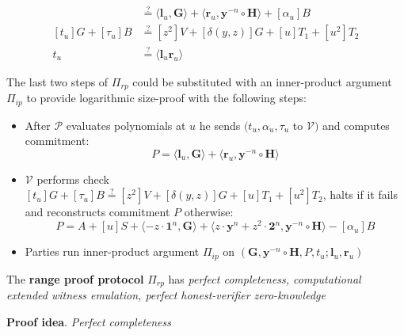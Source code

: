 \documentclass[../lecture-notes-148x210.tex]{subfiles}
\begin{document}
\begin{definition}
\begin{itemize}
\begin{equation}
\begin{aligned}
                    &\stackrel{\text{?}}{=} \langle \mathbf{l}_u, \mathbf{G} \rangle + \langle \mathbf{r}_u, \mathbf{y}^{-n} \circ \mathbf{H} \rangle + [\alpha_u]B \\
                    [t_u]G + [\tau_u]B &\stackrel{\text{?}}{=} [z^2]V + [\delta(y,z)]G + [u]T_1 + [u^2]T_2 \\
                    t_u &\stackrel{\text{?}}{=} \langle \mathbf{l}_u \mathbf{r}_u \rangle
                \end{aligned}
            \end{equation}
    \end{itemize}
\end{definition}

\begin{remark}
    The last two steps of $\Pi_{rp}$ could be substituted with an inner-product argument $\Pi_{ip}$ to provide logarithmic size-proof with the following steps:
    \begin{itemize}
        \item After $\mathcal{P}$ evaluates polynomials at $u$ he sends $(t_u, \alpha_u, \tau_u$ to $\mathcal{V})$ and computes commitment: 
        $$P = \langle \mathbf{l}_u, \mathbf{G} \rangle + \langle \mathbf{r}_u, \mathbf{y}^{-n} \circ \mathbf{H} \rangle$$
        \item $\mathcal{V}$ performs check $[t_u]G + [\tau_u]B \stackrel{\text{?}}{=} [z^2]V + [\delta(y,z)]G + [u]T_1 + [u^2]T_2$, halts if it fails and reconstructs commitment $P$ otherwise:
        $$P = A + [u]S + \langle -z \cdot \mathbf{1}^n, \mathbf{G} \rangle + \langle z \cdot \mathbf{y}^n + z^2 \cdot \mathbf{2}^n, \mathbf{y}^{-n} \circ \mathbf{H} \rangle - [\alpha_u]B$$
        \item Parties run inner-product argument $\Pi_{ip}$ on $(\mathbf{G},\mathbf{y}^{-n} \circ \mathbf{H}, P, t_u; \mathbf{l}_u, \mathbf{r}_u)$
    \end{itemize}
\end{remark}

\begin{theorem}
    The \textbf{range proof protocol} $\Pi_{rp}$ has \textit{perfect completeness, computational extended witness emulation, perfect honest-verifier zero-knowledge}
    \label{th:range_proof}
\end{theorem}
\textbf{Proof idea}. \textit{Perfect completeness} 
\end{document}
